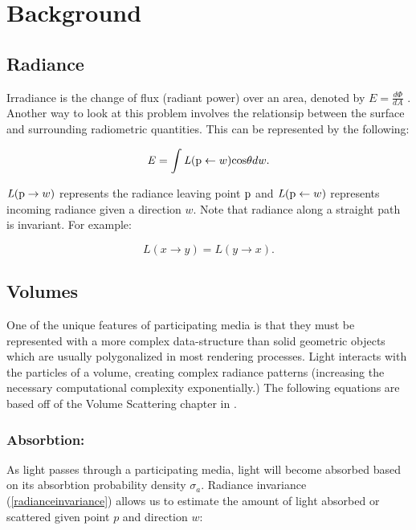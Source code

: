 \documentclass[runningheads]{llncs}
\begin{document}
\section{Background}
\label{background_sec}


\subsection{Radiance}
Irradiance is the change of flux (radiant power) over an area, denoted by $E = \frac{d\Phi}{dA}$ \cite{aga}. Another way to look at this problem involves the relationsip between the surface and surrounding radiometric quantities.  This can be represented by the following:

\begin{equation}
\mathit{E} = \int\mathit{L}(\textup{p} \leftarrow w)\textup{cos}\theta dw.
\label{irradiance}
\end{equation}

$\mathit{L}(\textup{p} \to w)$ represents the radiance leaving point $\textup{p}$ and $\mathit{L}(\textup{p} \leftarrow w)$ represents incoming radiance given a direction $w$.  Note that radiance along a straight path is invariant.  For example:

\begin{equation}
L(x \to y) = L(y \to x).
\label{radianceinvariance}
\end{equation}


\subsection{Volumes}
\label{volume_sec}
One of the unique features of participating media is that they must be represented with a more complex data-structure than solid geometric objects which are usually polygonalized in most rendering processes.  Light interacts with the particles of a volume, creating complex radiance patterns (increasing the necessary computational complexity exponentially.) The following equations are based off of the Volume Scattering chapter in \cite{pbrt}.

\subsubsection{Absorbtion:}
As light passes through a participating media, light will become absorbed based on its absorbtion probability density $\sigma_{a}$. Radiance invariance (\ref{radianceinvariance}) allows us to estimate the amount of light absorbed or scattered given point $p$ and direction $w$:
\end{document}
